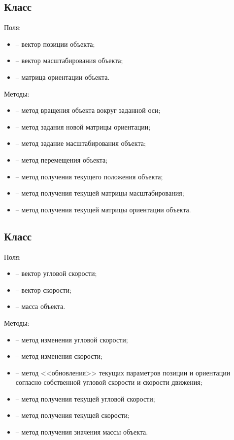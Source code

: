 \subsection{Класс }
\noindent\indent Поля:
\begin{itemize}
    \item {} -- вектор позиции объекта;
    \item {} -- вектор масштабирования объекта;
    \item {} -- матрица ориентации объекта.
\end{itemize}\par
    Методы:
\begin{itemize}
    \item {} -- метод вращения объекта
    вокруг заданной оси;
    \item {} -- метод задания новой матрицы
    ориентации;
    \item {} -- метод задание масштабирования объекта;
    \item {} -- метод перемещения объекта;
    \item {} -- метод получения текущего положения объекта;
    \item {} -- метод получения текущей матрицы масштабирования;
    \item {} -- метод получения текущей матрицы ориентации объекта.
\end{itemize}
\subsection{Класс }
\noindent\indent Поля:
\begin{itemize}
    \item {} -- вектор угловой скорости;
    \item {} -- вектор скорости;
    \item {} -- масса объекта.
\end{itemize}\par
    Методы:
\begin{itemize}
    \item {} -- метод изменения угловой скорости;
    \item {} -- метод изменения скорости;
    \item {} -- метод <<обновления>> текущих параметров позиции
    и ориентации согласно собственной угловой скорости и скорости движения;
    \item {} -- метод получения текущей угловой скорости;
    \item {} -- метод получения текущей скорости;
    \item {} -- метод получения значения массы объекта.
\end{itemize}
